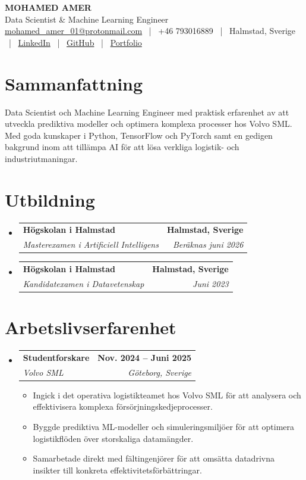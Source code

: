 \documentclass[10pt,a4paper]{article}
\makeatletter
\newcommand{\resumeItem}[1]{
  \item\small{
    {#1 \vspace{-2pt}}
  }
}
\newcommand{\resumeSubheading}[4]{
  \vspace{3pt}\item
    \begin{tabular*}{1.0\textwidth}[t]{l@{\extracolsep{\fill}}r}
      \textbf{#1} & \textbf{#2} \\
      \textit{\small#3} & \textit{\small #4} \\
    \end{tabular*}\vspace{-3pt}
}
\newcommand{\resumeSubHeadingListStart}{\begin{itemize}[leftmargin=0.0in, label={}]}
\newcommand{\resumeSubHeadingListEnd}{\end{itemize}}
\newcommand{\resumeItemListStart}{\begin{itemize}[leftmargin=0.15in]}
\newcommand{\resumeItemListEnd}{\end{itemize}\vspace{1pt}}
\makeatother
\begin{document}
\color{text}

\begin{center}
    {\Huge \textbf{MOHAMED AMER}} \\ \vspace{2pt}
    {\large Data Scientist \& Machine Learning Engineer} \\ \vspace{2pt}
    \small
     \href{mailto:mohamed_amer_01@protonmail.com}{mohamed\_amer\_01@protonmail.com} ~|~
     +46 793016889 ~|~
     Halmstad, Sverige ~|~
     \href{https://www.linkedin.com/in/mohamed-amer-5a7a55255}{LinkedIn} ~|~
     \href{https://github.com/ham0di01}{GitHub} ~|~
     \href{https://ham0di01.github.io/}{Portfolio}
\end{center}

\vspace{3pt}

\section{Sammanfattning}
\vspace{2pt}
\small{Data Scientist och Machine Learning Engineer med praktisk erfarenhet av att utveckla prediktiva modeller och optimera komplexa processer hos Volvo SML. Med goda kunskaper i Python, TensorFlow och PyTorch samt en gedigen bakgrund inom att tillämpa AI för att lösa verkliga logistik- och industriutmaningar.}
\vspace{2pt}

\section{Utbildning}
  \resumeSubHeadingListStart
    \resumeSubheading
      {Högskolan i Halmstad}{Halmstad, Sverige}
      {Masterexamen i Artificiell Intelligens}{Beräknas juni 2026}
    \resumeSubheading
      {Högskolan i Halmstad}{Halmstad, Sverige}
      {Kandidatexamen i Datavetenskap}{Juni 2023}
  \resumeSubHeadingListEnd

\section{Arbetslivserfarenhet}
  \resumeSubHeadingListStart
    \resumeSubheading
      {Studentforskare}{Nov. 2024 -- Juni 2025}
      {Volvo SML}{Göteborg, Sverige}
      \resumeItemListStart
        \resumeItem{Ingick i det operativa logistikteamet hos Volvo SML för att analysera och effektivisera komplexa försörjningskedjeprocesser.}
        \resumeItem{Byggde prediktiva ML-modeller och simuleringsmiljöer för att optimera logistikflöden över storskaliga datamängder.}
        \resumeItem{Samarbetade direkt med fältingenjörer för att omsätta datadrivna insikter till konkreta effektivitetsförbättringar.}
      \resumeItemListEnd
  \resumeSubHeadingListEnd
\end{document}

